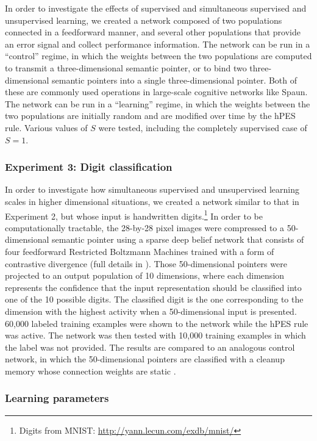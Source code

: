 \documentclass[10pt,letterpaper]{article}
\begin{document}
In order to investigate the effects of supervised and
simultaneous supervised and unsupervised learning,
we created a network composed of two populations
connected in a feedforward manner,
and several other populations that provide
an error signal and collect performance information.
The network can be run in a ``control'' regime,
in which the weights between the two populations
are computed to transmit a three-dimensional semantic pointer,
or to bind two three-dimensional semantic pointers
into a single three-dimensional pointer.
Both of these are commonly used operations
in large-scale cognitive networks like Spaun.
The network can be run in a ``learning'' regime,
in which the weights between the two populations
are initially random
and are modified over time by the hPES rule.
Various values of $S$ were tested,
including the completely supervised case of $S = 1$.

\subsubsection{Experiment 3: Digit classification}

In order to investigate how
simultaneous supervised and unsupervised learning
scales in higher dimensional situations,
we created a network similar to that in Experiment 2,
but whose input is handwritten digits.\footnote{Digits
  from MNIST: \url{http://yann.lecun.com/exdb/mnist/}}
In order to be computationally tractable,
the 28-by-28 pixel images were compressed to a 50-dimensional
semantic pointer using a sparse deep belief network
that consists of four feedforward
Restricted Boltzmann Machines
trained with a form of contrastive divergence
(full details in ).
Those 50-dimensional pointers were projected to
an output population of 10 dimensions,
where each dimension represents
the confidence that the input representation should
be classified into one of the 10 possible digits.
The classified digit is the one corresponding
to the dimension with the highest activity
when a 50-dimensional input is presented.
60,000 labeled training examples
were shown to the network while
the hPES rule was active.
The network was then tested with 10,000
training examples in which the label
was not provided.
The results are compared to an analogous control network,
in which the 50-dimensional pointers are classified
with a cleanup memory whose connection weights
are static \cite{Eliasmith2012}.

\subsubsection{Learning parameters}
\end{document}
